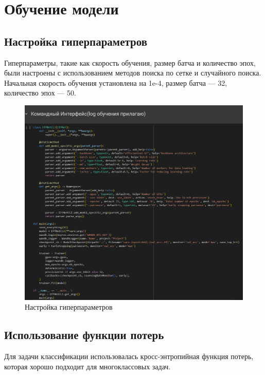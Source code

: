 \documentclass[14pt]{extarticle}
\begin{document}
\section{Обучение модели}
\subsection{Настройка гиперпараметров}
\hspace{1cm}Гиперпараметры, такие как скорость обучения, размер батча и количество эпох, были настроены с использованием методов поиска по сетке и случайного поиска. Начальная скорость обучения установлена на 1e-4, размер батча — 32, количество эпох — 50.
\begin{figure}[H]
    \centering
    \includegraphics[width=12cm]{images/8.png}
    \caption{Настройка гиперпараметров}
    \label{fig:10}
\end{figure}

\subsection{Использование функции потерь}
\hspace{1cm}Для задачи классификации использовалась кросс-энтропийная функция потерь, которая хорошо подходит для многоклассовых задач.
\end{document}
